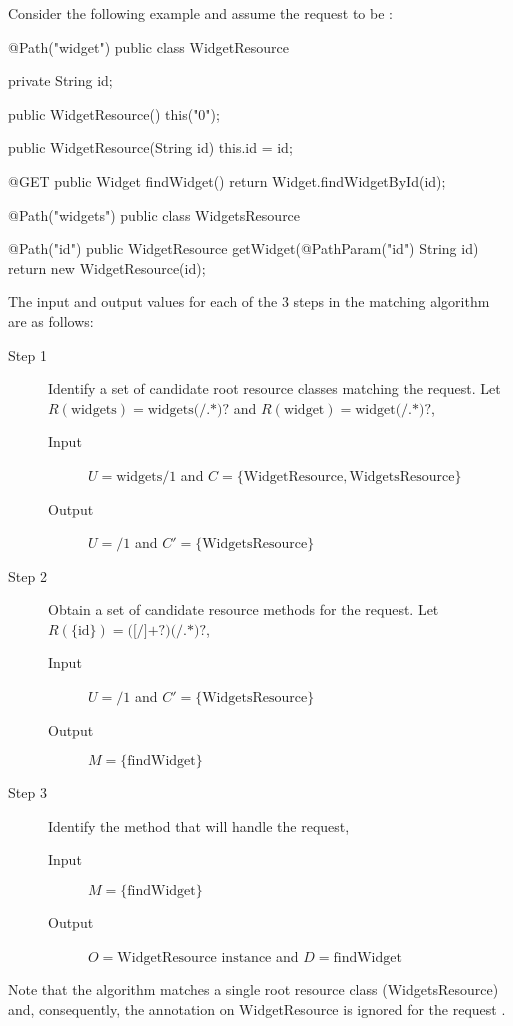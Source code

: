 \begin{enumerate}
Consider the following example and assume the request to be  :

\begin{listing}{1}
@Path("widget")
public class WidgetResource {
    private String id;

    public WidgetResource() {
        this("0");
    }

    public WidgetResource(String id) {
        this.id = id;
    }

    @GET
    public Widget findWidget() {
        return Widget.findWidgetById(id);
    }
}

@Path("widgets")
public class WidgetsResource {

    @Path("{id}")
    public WidgetResource getWidget(@PathParam("id") String id) {
        return new WidgetResource(id);
    }
}
\end{listing}

The input and output values for each of the 3 steps in the matching algorithm are as follows:
\begin{description}
\item[Step 1] Identify a set of candidate root resource classes matching the request. Let $R(\mbox{widgets}) = \mbox{widgets(/.*)?}$ and $R(\mbox{widget}) = \mbox{widget(/.*)?}$,
\begin{description}
\item[Input] $U = \mbox{widgets/1}$ and $C = \{\mbox{WidgetResource}, \mbox{WidgetsResource}\}$
\item[Output] $U = \mbox{/1}$ and $C' = \{\mbox{WidgetsResource}\}$
\end{description}
\item[Step 2] Obtain a set of candidate resource methods for the request. Let $R(\{\mbox{id}\}) = \mbox{([\^{ }/]+?)(/.*)?}$,
\begin{description}
\item[Input] $U = \mbox{/1}$ and $C' = \{\mbox{WidgetsResource}\}$
\item[Output] $M = \{\mbox{findWidget}\}$
\end{description}
\item[Step 3] Identify the method that will handle the request,
\begin{description}
\item[Input] $M = \{\mbox{findWidget}\}$
 \item[Output] $O = \mbox{WidgetResource instance}$ and $D = \mbox{findWidget}$
\end{description}
\end{description}

Note that the algorithm matches a single root resource class (WidgetsResource) and, consequently, the  annotation on WidgetResource is ignored for the request  .

\end{enumerate}

